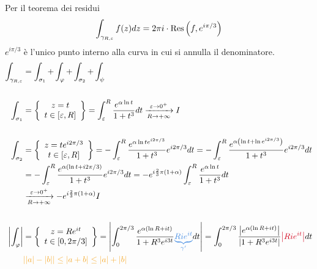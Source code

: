 Per il teorema dei residui
\begin{equation*}
\int_{\gamma_{R, \varepsilon}} f(z) dz = 2\pi i \cdot \operatorname{Res} \left(f, e^{i\pi /3}\right)
\end{equation*}
$e^{i\pi /3}$ è l'unico punto interno alla curva in cui si annulla il denominatore.
\begin{equation*}
\begin{aligned}
\int_{\gamma_{R, \varepsilon}} & = \int_{\sigma_{1}} + \int_{\varphi} + \int_{\sigma_{2}} + \int_{\psi}\\
 & \\
\int_{\sigma_{1}} & = \left\{
\begin{array}{c}
z = t\\
t\in [ \varepsilon, R]
\end{array}\right\} = \int^{R}_{\varepsilon}\frac{e^{\alpha \ln t}}{1 + t^{3}} dt\xrightarrow[R\rightarrow + \infty ]{\varepsilon \rightarrow 0^{+}} I\\
 & \\
\int_{\sigma_{2}} & = \left\{
\begin{array}{c}
z = te^{i2\pi /3}\\
t\in [ \varepsilon, R]
\end{array}\right\} = - \int^{R}_{\varepsilon}\frac{e^{\alpha \ln te^{i2\pi /3}}}{1 + t^{3}} e^{i2\pi /3} dt = -\int^{R}_{\varepsilon}\frac{e^{\alpha \left(\ln t + \ln e^{i2\pi /3}\right)}}{1 + t^{3}} e^{i2\pi /3} dt\\
 & = - \int^{R}_{\varepsilon}\frac{e^{\alpha (\ln t + i2\pi /3)}}{1 + t^{3}} e^{i2\pi /3} dt = -e^{i\frac{2}{3} \pi (1 + \alpha)}\int^{R}_{\varepsilon}\frac{e^{\alpha \ln t}}{1 + t^{3}} dt\\
 & \xrightarrow[R\rightarrow + \infty ]{\varepsilon \rightarrow 0^{+}} - e^{i\frac{2}{3} \pi (1 + \alpha)} I\\
 & \\
\left| \int_{\varphi}\right| & = \left\{
\begin{array}{c}
z = Re^{it}\\
t\in [ 0, 2\pi /3]
\end{array}\right\} = \left| \int^{2\pi /3}_{0}\frac{e^{\alpha (\ln R + it)}}{1 + R^{3} e^{i3t}}\textcolor[rgb]{0.29, 0.56, 0.89}{\underbrace{Rie^{it}}_{\gamma'}} dt\right| = \int^{2\pi /3}_{0}\frac{\left| e^{\alpha (\ln R + it)}\right|}{\left| 1 + R^{3} e^{i3t}\right|}\textcolor[rgb]{0.82, 0.01, 0.11}{\left| Rie^{it}\right|} dt\\
 & \textcolor[rgb]{0.96, 0.65, 0.14}{| | a| - | b| | \leq | a + b| \leq | a| + | b|}\\

\end{aligned}
\end{equation*}
